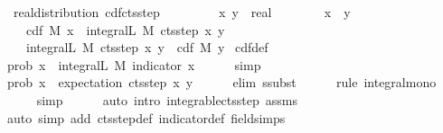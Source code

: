 \documentclass{article}
\theoremstyle{definition}
\begin{document}
\medskip

\begin{isabellebody}
\isamarkupfalse%
\ {\isacharparenleft}\ real{\isacharunderscore}distribution{\isacharparenright}\ cdf{\isacharunderscore}cts{\isacharunderscore}step{\isacharcolon}\isanewline
\ \ \ \ \isanewline
\ \ \ \ x\ y\ {\isacharcolon}{\isacharcolon}\ real\isanewline
\ \ \ \isanewline
\ \ \ \ {\isachardoublequoteopen}x\ {\isacharless}\ y{\isachardoublequoteclose}\isanewline
\ \ \ \isanewline
\ \ \ \ {\isachardoublequoteopen}cdf\ M\ x\ {\isasymle}\ integral\isactrlsup L\ M\ {\isacharparenleft}cts{\isacharunderscore}step\ x\ y{\isacharparenright}{\isachardoublequoteclose}\ \isanewline
\ \ \ \ {\isachardoublequoteopen}integral\isactrlsup L\ M\ {\isacharparenleft}cts{\isacharunderscore}step\ x\ y{\isacharparenright}\ {\isasymle}\ cdf\ M\ y{\isachardoublequoteclose}\isanewline
{}\isamarkupfalse%
\ cdf{\isacharunderscore}def\ \isanewline
{}\isamarkupfalse%
\ {\isacharminus}\isanewline
\ \ \isamarkupfalse%
\ {\isachardoublequoteopen}prob\ {\isacharbraceleft}{\isachardot}{\isachardot}x{\isacharbraceright}\ {\isacharequal}\ integral\isactrlsup L\ M\ {\isacharparenleft}indicator\ {\isacharbraceleft}{\isachardot}{\isachardot}x{\isacharbraceright}{\isacharparenright}{\isachardoublequoteclose}\isanewline
\ \ \ \ \isamarkupfalse%
\ simp\isanewline
\ \ \isamarkupfalse%
\ {\isachardoublequoteopen}prob\ {\isacharbraceleft}{\isachardot}{\isachardot}x{\isacharbraceright}\ {\isasymle}\ expectation\ {\isacharparenleft}cts{\isacharunderscore}step\ x\ y{\isacharparenright}{\isachardoublequoteclose}\isanewline
\ \ \ \ \isamarkupfalse%
\ {\isacharparenleft}elim\ ssubst{\isacharparenright}\isanewline
\ \ \ \ \isamarkupfalse%
\ {\isacharparenleft}rule\ integral{\isacharunderscore}mono{\isacharparenright}\isanewline
\ \ \ \ \isamarkupfalse%
\ simp\isanewline
\ \ \ \ \isamarkupfalse%
\ {\isacharparenleft}auto\ intro{\isacharbang}{\isacharcolon}\ integrable{\isacharunderscore}cts{\isacharunderscore}step\ assms{\isacharparenright}\ {\isacharbrackleft}{\isacharbrackright}\isanewline
\ \ \ \ \isamarkupfalse%
\ {\isacharparenleft}auto\ simp\ add{\isacharcolon}\ cts{\isacharunderscore}step{\isacharunderscore}def\ indicator{\isacharunderscore}def\ field{\isacharunderscore}simps{\isacharparenright}\isanewline
\ \ \ \ \isamarkupfalse%

\end{isabellebody}
\end{document}
